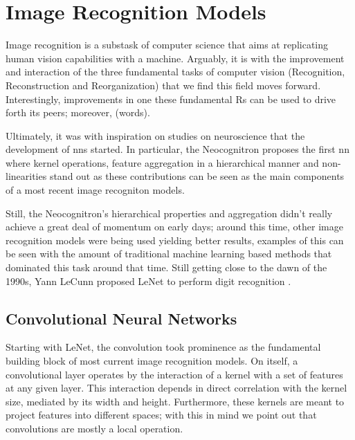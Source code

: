 \section{Image Recognition Models}
\label{rel:sec_imrecon}
Image recognition is a substask of computer science that aims at replicating human vision capabilities 
with a machine. Arguably, it is with the improvement and interaction of the three fundamental tasks 
of computer vision (Recognition, Reconstruction and Reorganization) \autocite{malik2016three} that we 
find this field moves forward. Interestingly, improvements in one these fundamental Rs can be 
used to drive forth its peers; moreover, (words).





Ultimately, it was with inspiration on studies on neuroscience \autocite{hubel1959receptive} that the 
development of \glspl{nn} started. In particular, the Neocognitron \autocite{fukushima1975cognitron} 
proposes the first \gls{nn} where kernel operations, feature aggregation in a hierarchical 
manner and non-linearities stand out as these contributions can be seen as the main components of a 
most recent image recogniton models.

Still, the Neocognitron's hierarchical properties and aggregation didn't really achieve 
a great deal of momentum on early days; around this time, other image recognition models were being 
used yielding better results, examples of this can be seen with the amount of traditional machine 
learning based methods that dominated this task around that time. Still getting close to the dawn 
of the 1990s, Yann LeCunn proposed LeNet to perform digit recognition \autocite{lecun1998gradient}.\\

\subsection{Convolutional Neural Networks}
\label{rel:sub_cnn}
Starting with LeNet, the convolution took prominence as the fundamental building block 
of most current image recognition models. On itself, a convolutional layer operates by the 
interaction of a kernel with a set of features at any given layer. This interaction depends in 
direct correlation with the kernel size, mediated by its width and height. Furthermore, 
these kernels are meant to project features into different spaces; with this in mind we point out 
that convolutions are mostly a local operation. 
%

